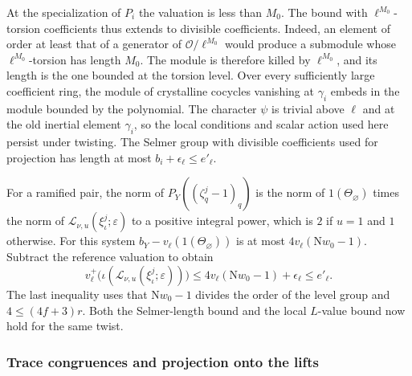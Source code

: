 At the specialization of \(P_i\) the valuation is less than \(M_0\).
The bound with \(\ell^{M_0}\)-torsion coefficients thus extends to
divisible coefficients. Indeed, an element of order at least that of
a generator of \(\mathcal O/\ell^{M_0}\) would produce a submodule
whose \(\ell^{M_0}\)-torsion has length \(M_0\). The module is
therefore killed by \(\ell^{M_0}\), and its length is the one bounded
at the torsion level. Over every sufficiently large coefficient ring,
the module of crystalline cocycles vanishing at \(\gamma_i\) embeds
in the module bounded by the polynomial. The character \(\psi\) is
trivial above \(\ell\) and at the old inertial element \(\gamma_i\),
so the local conditions and scalar action used here persist under
twisting. The Selmer group with divisible coefficients used for
projection has length at most \(b_i+\epsilon_\ell\le e'_\ell\).

For a ramified pair, the norm of \(P_Y((\zeta_q^j-1)_q)\) is the
norm of \(1(\Theta_\varnothing)\) times the norm of
\(\mathcal L_{\nu,u}(\xi_\iota^j;\varepsilon)\) to a positive integral
power, which is \(2\) if \(u=1\) and \(1\) otherwise.
For this system \(b_Y-v_\ell(1(\Theta_\varnothing))\) is at
most \(4v_\ell(\mathrm Nw_0-1)\). Subtract the reference valuation to
obtain
\[
 v_\ell^+\bigl(\iota(\mathcal L_{\nu,u}(\xi_\iota^j;\varepsilon))\bigr)
 \le 4v_\ell(\mathrm Nw_0-1)+\epsilon_\ell
 \le e'_\ell .
\]
The last inequality uses that \(\mathrm Nw_0-1\) divides the order
of the level group and \(4\le(4f+3)r\). Both the Selmer-length bound
and the local \(L\)-value bound now hold for the same twist.

\subsubsection{Trace congruences and projection onto the lifts}

